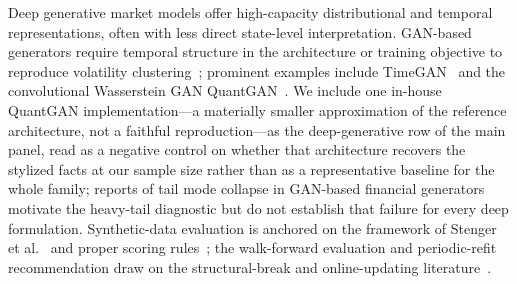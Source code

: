 Deep generative market models offer high-capacity distributional and temporal representations, often with less direct state-level interpretation. GAN-based generators require temporal structure in the architecture or training objective to reproduce volatility clustering~\cite{takahashi2019modeling}; prominent examples include TimeGAN~\cite{yoon2019timegan} and the convolutional Wasserstein GAN QuantGAN~\cite{wiese2020quantgan}. We include one in-house QuantGAN implementation---a materially smaller approximation of the reference architecture, not a faithful reproduction---as the deep-generative row of the main panel, read as a negative control on whether that architecture recovers the stylized facts at our sample size rather than as a representative baseline for the whole family; reports of tail mode collapse in GAN-based financial generators~\cite{takahashi2019modeling} motivate the heavy-tail diagnostic but do not establish that failure for every deep formulation. Synthetic-data evaluation is anchored on the framework of Stenger et al.~\cite{stenger2024thinking} and proper scoring rules~\cite{gneiting2007strictly}; the walk-forward evaluation and periodic-refit recommendation draw on the structural-break and online-updating literature~\cite{cappe2011online}.
